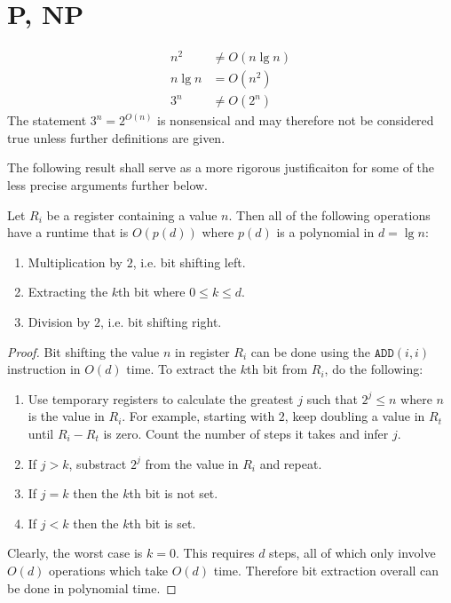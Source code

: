 \documentclass{article}
\begin{document}
\section{P, NP}

\begin{claim*}[a]
	\begin{align}
		\label{on2}
		n^2    & \not=O(n\lg n) \\
		\label{onlgn}
		n\lg n & =O(n^2)        \\
		\label{o3n}
		3^n    & \not=O(2^n)
	\end{align}
	The statement $3^n=2^{O(n)}$ is nonsensical and may therefore not be considered true
	unless further definitions are given.
\end{claim*}

The following result shall serve as a more rigorous justificaiton for some of the less precise
arguments further below.

\begin{lemma*}
	\label{pbits}
	Let $R_i$ be a register containing a value $n$. Then all of the following operations
	have a runtime that is $O(p(d))$ where $p(d)$ is a polynomial in $d=\lg n$:
	\begin{enumerate}
		\item Multiplication by $2$, i.e. bit shifting left.
		\item Extracting the $k$th bit where $0\leq k\leq d$.
		\item Division by $2$, i.e. bit shifting right.
	\end{enumerate}
	\begin{proof}
		Bit shifting the value $n$ in register $R_i$ can be done using the $\texttt{ADD}(i,i)$
		instruction in $O(d)$ time.
		To extract the $k$th bit from $R_i$, do the following:
		\begin{enumerate}
			\item Use temporary registers to calculate the greatest $j$ such that $2^j\leq n$
			      where $n$ is the value in $R_i$.
			      For example, starting with $2$, keep doubling a value in $R_t$ until $R_i-R_t$
			      is zero. Count the number of steps it takes and infer $j$.
			\item If $j>k$, substract $2^j$ from the value in $R_i$ and repeat.
			\item If $j=k$ then the $k$th bit is not set.
			\item If $j<k$ then the $k$th bit is set.
		\end{enumerate}
		Clearly, the worst case is $k=0$. This requires $d$ steps, all of which only involve
		$O(d)$ operations which take $O(d)$ time. Therefore bit extraction overall can be done
		in polynomial time.
	\end{proof}
\end{lemma*}
\end{document}
